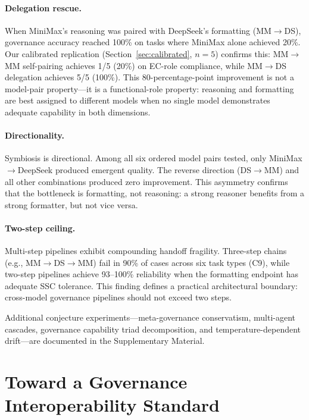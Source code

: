 \documentclass[11pt,a4paper]{article}
\begin{document}
\paragraph{Delegation rescue.} When MiniMax's reasoning was paired with DeepSeek's formatting (MM$\rightarrow$DS), governance accuracy reached 100\% on tasks where MiniMax alone achieved 20\%. Our calibrated replication (Section~\ref{sec:calibrated}, $n=5$) confirms this: MM$\rightarrow$MM self-pairing achieves 1/5 (20\%) on EC-role compliance, while MM$\rightarrow$DS delegation achieves 5/5 (100\%). This 80-percentage-point improvement is not a model-pair property---it is a functional-role property: reasoning and formatting are best assigned to different models when no single model demonstrates adequate capability in both dimensions.

\paragraph{Directionality.} Symbiosis is directional. Among all six ordered model pairs tested, only MiniMax$\rightarrow$DeepSeek produced emergent quality. The reverse direction (DS$\rightarrow$MM) and all other combinations produced zero improvement. This asymmetry confirms that the bottleneck is formatting, not reasoning: a strong reasoner benefits from a strong formatter, but not vice versa.

\paragraph{Two-step ceiling.} Multi-step pipelines exhibit compounding handoff fragility. Three-step chains (e.g., MM$\rightarrow$DS$\rightarrow$MM) fail in 90\% of cases across six task types (C9), while two-step pipelines achieve 93--100\% reliability when the formatting endpoint has adequate SSC tolerance. This finding defines a practical architectural boundary: cross-model governance pipelines should not exceed two steps.

Additional conjecture experiments---meta-governance conservatism, multi-agent cascades, governance capability triad decomposition, and temperature-dependent drift---are documented in the Supplementary Material.


\section{Toward a Governance Interoperability Standard}
\end{document}
